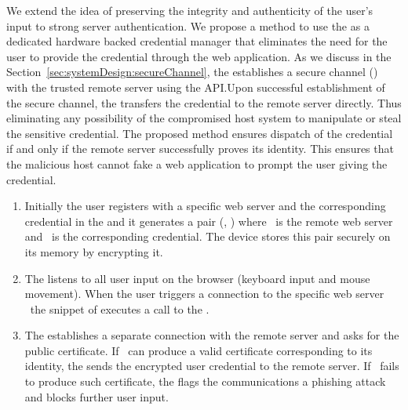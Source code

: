We extend the idea of preserving the integrity and authenticity of the user's input to strong server authentication.
We propose a method to use the \device as a dedicated hardware backed credential manager that eliminates the need for the user to provide the credential through the web application. As we discuss in the Section~\ref{sec:systemDesign:secureChannel}, the \device establishes a secure channel (\tls) with the trusted remote server using the \webusb API.Upon successful establishment of the secure channel, the \device transfers the credential to the remote server directly. Thus eliminating any possibility of the compromised host system to manipulate or steal the sensitive credential. The proposed method ensures dispatch of the credential if and only if the remote server successfully proves its identity. This ensures that the malicious host cannot fake a web application to prompt the user giving the credential. 

\iffalse 
We extend the idea of protecting the integrity of the input data and strong server authentication to use the \device as a dedicated hardware backed password manager. This provides protection against phishing website that tracks the users into leaking their credentials. The device prevents thing by establishing secure channel using the \webusb API. Upon successful identification, the \device transfer encrypted credential what are pre-inserted by the user over the secure channel. Thus preventing users accidentally providing the credential to a phishing website. 
\fi

\begin{enumerate}

  \item Initially the user registers with a specific web server and the corresponding credential in the \device and it generates a pair (\server, \credential) where \server\ is the remote web server and \credential\ is the corresponding credential. The device stores this pair securely on its memory by encrypting it.
  
  \item The \device listens to all user input on the browser (keyboard input and mouse movement). When the user triggers a connection to the specific web server \server\ the \js snippet of \server executes a \webusb call to the \device.
  
  \item The \device establishes a separate \tls connection with the remote server and asks for the public certificate. If \server\ can produce a valid certificate corresponding to its identity, the \device sends the encrypted user credential to the remote server. If \server\ fails to produce such certificate, the \device flags the communications a phishing attack and blocks further user input.
\end{enumerate}


